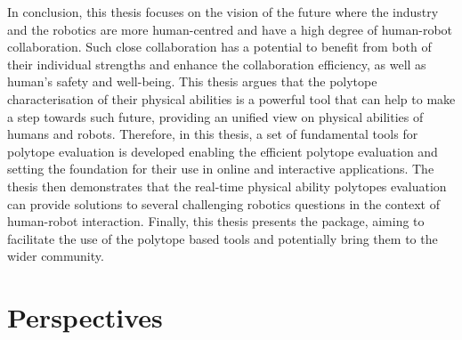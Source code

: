 In conclusion, this thesis focuses on the vision of the future where the industry and the robotics are more human-centred and have a high degree of human-robot collaboration. Such close collaboration has a potential to benefit from both of their individual strengths and enhance the collaboration efficiency, as well as human's safety and well-being. This thesis argues that the polytope characterisation of their physical abilities is a powerful tool that can help to make a step towards such future, providing an unified view on physical abilities of humans and robots. Therefore, in this thesis, a set of fundamental tools for polytope evaluation is developed enabling the efficient polytope evaluation and setting the foundation for their use in online and interactive applications. The thesis then demonstrates that the real-time physical ability polytopes evaluation can provide solutions to several challenging robotics questions in the context of human-robot interaction. Finally, this thesis presents the  package, aiming to facilitate the use of the polytope based tools and potentially bring them to the wider community.



\section{Perspectives}

